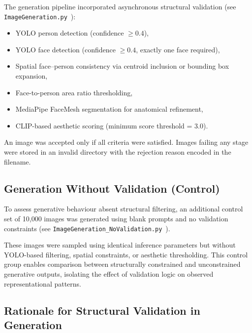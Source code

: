 The generation pipeline incorporated asynchronous structural validation (see \texttt{ImageGeneration.py}~\cite{turn2file0}):

\begin{itemize}
	\item YOLO person detection (confidence $\geq 0.4$),
	\item YOLO face detection (confidence $\geq 0.4$, exactly one face required),
	\item Spatial face–person consistency via centroid inclusion or bounding box expansion,
	\item Face-to-person area ratio thresholding,
	\item MediaPipe FaceMesh segmentation for anatomical refinement,
	\item CLIP-based aesthetic scoring (minimum score threshold = 3.0).
\end{itemize}

An image was accepted only if all criteria were satisfied. Images failing any stage were stored in an invalid directory with the rejection reason encoded in the filename.


\subsection{Generation Without Validation (Control)}

To assess generative behaviour absent structural filtering, an additional control set of 10,000 images was generated using blank prompts and no validation constraints (see \texttt{ImageGeneration\_NoValidation.py}~\cite{turn2file1}). 

These images were sampled using identical inference parameters but without YOLO-based filtering, spatial constraints, or aesthetic thresholding. This control group enables comparison between structurally constrained and unconstrained generative outputs, isolating the effect of validation logic on observed representational patterns.

\subsection{Rationale for Structural Validation in Generation}

